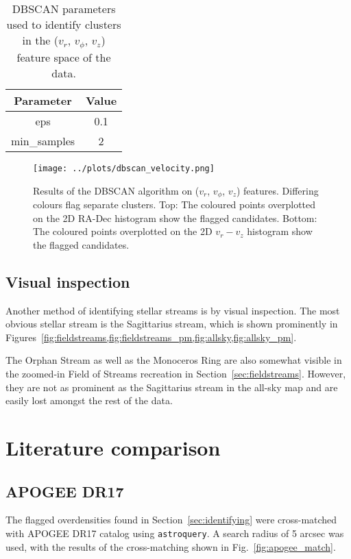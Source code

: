 \documentclass[11pt,a4paper]{article}
\begin{document}
\begin{table}[h]
    \centering
    \begin{tabular}{c|c}
    Parameter & Value \\
    \hline
    eps & 0.1 \\
    min\_samples & 2 \\
    \end{tabular}
    \caption{DBSCAN parameters used to identify clusters in the ($v_r$, $v_\phi$, $v_z$) feature space of the data.}
    \label{tab:dbscan_params2}
\end{table}

\begin{figure}
    \centering
    \texttt{[image: ../plots/dbscan\_velocity.png]}
    \caption{Results of the DBSCAN algorithm on ($v_r$, $v_\phi$, $v_z$) features. Differing colours flag separate clusters. Top: The coloured points overplotted on the 2D RA-Dec histogram show the flagged candidates. Bottom: The coloured points overplotted on the 2D $v_r-v_z$ histogram show the flagged candidates.}
    \label{fig:dbscan2}
\end{figure}

\subsection{Visual inspection}
Another method of identifying stellar streams is by visual inspection. The most obvious stellar stream is the Sagittarius stream, which is shown prominently in Figures~\cref{fig:fieldstreams,fig:fieldstreams_pm,fig:allsky,fig:allsky_pm}.

The Orphan Stream as well as the Monoceros Ring are also somewhat visible in the zoomed-in Field of Streams recreation in Section~\ref{sec:fieldstreams}. However, they are not as prominent as the Sagittarius stream in the all-sky map and are easily lost amongst the rest of the data.

\section{Literature comparison}
\subsection{APOGEE DR17}
\label{sec:apogee}
The flagged overdensities found in Section~\ref{sec:identifying} were cross-matched with APOGEE DR17 catalog using \texttt{astroquery}. A search radius of 5 arcsec was used, with the results of the cross-matching shown in Fig.~\ref{fig:apogee_match}.
\end{document}
